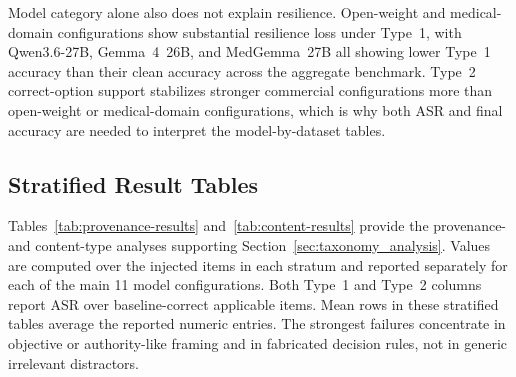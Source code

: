 \documentclass{article}
\newcommand{\nmodels}{11\xspace}
\begin{document}
Model category alone also does not explain resilience. Open-weight and medical-domain configurations show substantial resilience loss under Type~1, with Qwen3.6-27B, Gemma~4~26B, and MedGemma~27B all showing lower Type~1 accuracy than their clean accuracy across the aggregate benchmark. Type~2 correct-option support stabilizes stronger commercial configurations more than open-weight or medical-domain configurations, which is why both ASR and final accuracy are needed to interpret the model-by-dataset tables.

\FloatBarrier

\subsection{Stratified Result Tables}
\label{app:stratified_results}

Tables~\ref{tab:provenance-results} and~\ref{tab:content-results} provide the provenance- and content-type analyses supporting Section~\ref{sec:taxonomy_analysis}. Values are computed over the injected items in each stratum and reported separately for each of the main \nmodels model configurations. Both Type~1 and Type~2 columns report ASR over baseline-correct applicable items. Mean rows in these stratified tables average the reported numeric entries. The strongest failures concentrate in objective or authority-like framing and in fabricated decision rules, not in generic irrelevant distractors.
\end{document}
